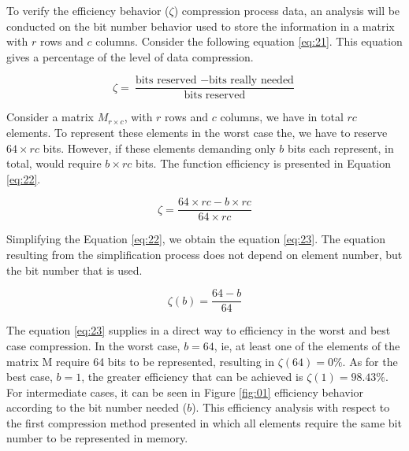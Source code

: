 \documentclass[10pt]{article}
\begin{document}
To verify the efficiency behavior ($\zeta$) compression process data, an analysis will be conducted on the bit number behavior used to store the information in a matrix with $r$ rows and $c$ columns. Consider the following equation \ref{eq:21}. This equation gives a percentage of the level of data compression.

\begin{equation} \label{eq:21}
 \zeta = \frac{\text{bits reserved } - \text{bits really needed}}{\text{bits reserved}}
\end{equation}

Consider a matrix $M_{r \times c}$, with $r$ rows and $c$ columns, we have in total $rc$ elements. To represent these elements in the worst case the, we have to reserve $64 \times rc$ bits. However, if these elements demanding only $b$ bits each represent, in total, would require $b \times rc$ bits. The function efficiency is presented in Equation \ref{eq:22}.

\begin{equation}\label{eq:22}
 \zeta = \frac{64 \times rc - b \times rc}{64 \times rc}
\end{equation}

Simplifying the Equation \ref{eq:22}, we obtain the equation \ref{eq:23}. The equation resulting from the simplification process does not depend on element number, but the bit number that is used.

\begin{equation} \label{eq:23}
 \zeta(b) = \frac{64  - b }{64}
\end{equation}

The equation \ref{eq:23} supplies in a direct way to efficiency in the worst and best case compression. In the worst case, $b = 64$, ie, at least one of the elements of the matrix M require 64 bits to be represented, resulting in $\zeta(64)=0\%$. As for the best case, $b=1$, the greater efficiency that can be achieved is $\zeta(1)=98.43\%$. For intermediate cases, it can be seen in Figure \ref{fig:01} efficiency behavior according to the bit number needed ($b$). This efficiency analysis  with respect to the first compression method presented in which all elements require the same bit number to be represented in memory.
\end{document}
